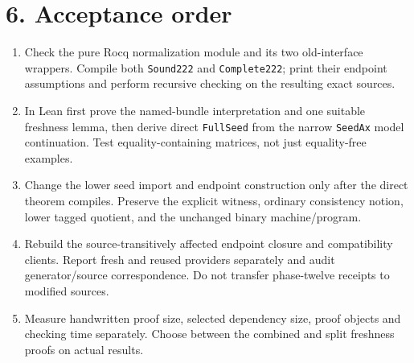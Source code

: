 \documentclass[10pt]{article}
\newcommand{\code}[1]{\texttt{#1}}
\begin{document}
\section*{6. Acceptance order}
\begin{enumerate}
\item Check the pure Rocq normalization module and its two old-interface wrappers. Compile both \code{Sound222} and \code{Complete222}; print their endpoint assumptions and perform recursive checking on the resulting exact sources.
\item In Lean first prove the named-bundle interpretation and one suitable freshness lemma, then derive direct \code{FullSeed} from the narrow \code{SeedAx} model continuation. Test equality-containing matrices, not just equality-free examples.
\item Change the lower seed import and endpoint construction only after the direct theorem compiles. Preserve the explicit witness, ordinary consistency notion, lower tagged quotient, and the unchanged binary machine/program.
\item Rebuild the source-transitively affected endpoint closure and compatibility clients. Report fresh and reused providers separately and audit generator/source correspondence. Do not transfer phase-twelve receipts to modified sources.
\item Measure handwritten proof size, selected dependency size, proof objects and checking time separately. Choose between the combined and split freshness proofs on actual results.
\end{enumerate}
\end{document}
